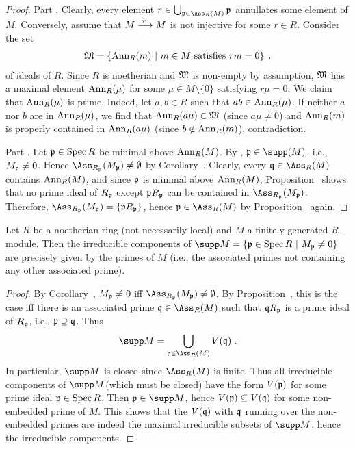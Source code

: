 \documentclass[a4paper,parskip=half,numbers=enddot, DIV=12]{scrreprt}
\begin{document}
\begin{proof}
	Part . Clearly, every element $r\in \bigcup_{\pp\in \Ass_R(M)}\pp$ annullates some element of $M$. Conversely, assume that $M\morphism[\smash{r\cdot}]M$ is not injective for some $r\in R$. Consider the set
	\begin{align*}
		\mathfrak{M}=\left\{\operatorname{Ann}_R(m)\ \middle|\  m\in M\text{ satisfies }rm=0\right\}\;.
	\end{align*}
	of ideals of $R$. Since $R$ is noetherian and $\mathfrak{M}$ is non-empty by assumption, $\mathfrak{M}$ has a maximal element $\operatorname{Ann}_R(\mu)$ for some $\mu\in M\setminus\{0\}$ satisfying $r\mu=0$. We claim that $\operatorname{Ann}_R(\mu)$ is prime. Indeed, let $a,b\in R$ such that $ab\in \operatorname{Ann}_R(\mu)$. If neither $a$ nor $b$ are in $\operatorname{Ann}_R(\mu)$, we find that $\operatorname{Ann}_R(a\mu)\in\mathfrak{M}$ (since $a\mu\neq 0$) and $\operatorname{Ann}_R(m)$ is properly contained in $\operatorname{Ann}_R(a\mu)$ (since $b\notin\operatorname{Ann}_R(m)$), contradiction.
	
	Part . Let $\mathfrak{p}\in\operatorname{Spec} R$ be minimal above $\operatorname{Ann}_R(M)$. By \cite[Lemma~3.4.1]{alg2}, $\pp\in\supp(M)$, i.e., $M_{\mathfrak{p}}\neq 0$. Hence $\Ass_{R_\pp}(M_\pp)\neq\emptyset$ by Corollary~. Clearly, every $\qq\in\Ass_R(M)$ contains $\operatorname{Ann}_R(M)$, and since $\mathfrak{p}$ is minimal above $\operatorname{Ann}_R(M)$, Proposition~ shows that no prime ideal of $R_{\mathfrak{p}}$ except $\mathfrak{p} R_{\mathfrak{p}}$ can be contained in $\Ass_{R_\pp}(M_\pp)$. Therefore, $\Ass_{R_\pp}(M_\pp)=\{\pp R_\pp\}$, hence $\pp\in\Ass_R(M)$ by Proposition~ again.
\end{proof}
\begin{fact}
	Let $R$ be a noetherian ring (not necessarily local) and $M$ a finitely generated $R$-module. Then the irreducible components of $\supp M=\left\{\pp\in\Spec R\st M_\pp\neq 0\right\}$ are precisely given by the  primes of $M$ (i.e., the associated primes not containing any other associated prime).
\end{fact}
\begin{proof}
	By Corollary~, $M_{\mathfrak{p}}\neq 0$ iff $\Ass_{R_\pp}(M_\pp)\neq\emptyset$. By Proposition~, this is the case iff there is an associated prime $\qq\in \Ass_R(M)$ such that $\mathfrak{q} R_{\mathfrak{p}}$ is a prime ideal of $R_{\mathfrak{p}}$, i.e., $\mathfrak{p}\supseteq \mathfrak{q}$. Thus
	\begin{align*}
		\supp M=\bigcup_{\qq\in\Ass_R(M)}V(\qq)\;.
	\end{align*}
	In particular, $\supp M$ is closed since $\Ass_R(M)$ is finite. Thus all irreducible components of $\supp M$(which must be closed)  have the form $V(\mathfrak{p})$ for some prime ideal $\mathfrak{p}\in\operatorname{Spec} R$. Then $\pp\in\supp M$, hence $V(\mathfrak{p})\subseteq V(\mathfrak{q})$ for some non-embedded prime of $M$. This shows that the $V(\mathfrak{q})$ with $\mathfrak{q}$ running over the non-embedded primes are indeed the maximal irreducible subsets of $\supp M$, hence the irreducible components.
\end{proof}


\printbibliography
\end{document}
